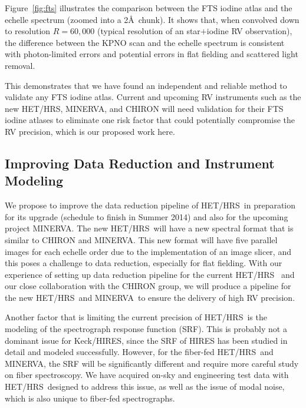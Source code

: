 \documentclass[12pt]{article}
\def\minerva{MINERVA}
\def\hrs{HET/HRS}
\def\keck{Keck/HIRES}
\begin{document}
Figure~\ref{fig:fts} illustrates the comparison between the FTS iodine
atlas and the echelle spectrum (zoomed into a 2\AA\ chunk). It shows
that, when convolved down to resolution $R=60,000$ (typical resolution
of an star$+$iodine RV observation), the difference between the KPNO
scan and the echelle spectrum is consistent with photon-limited
errors and potential errors in flat fielding and scattered light
removal.

This demonstrates that we have found an independent and reliable
method to validate any FTS iodine atlas. Current and upcoming RV
instruments such as the new \hrs, \minerva, and CHIRON will need
validation for their FTS iodine atlases to eliminate one risk factor
that could potentially compromise the RV precision, which is our
proposed work here.

\vspace{-10pt}
\subsection{Improving Data Reduction and Instrument Modeling}\label{sec:ip}
\vspace{-5pt}

We propose to improve the data reduction pipeline of \hrs\ in
preparation for its upgrade (schedule to finish in Summer 2014) and
also for the upcoming project \minerva. The new \hrs\ will have a new spectral
format that is similar to CHIRON and \minerva. This new format will
have five parallel images for each echelle order due to the
implementation of an image slicer, and this poses a challenge to data
reduction, especially for flat fielding. With our experience of
setting up data reduction pipeline for the current
\hrs\ \citep{wang2012} and our close collaboration with the CHIRON
group, we will produce a pipeline for the new \hrs\ and
\minerva\ to ensure the delivery of high RV precision.

Another factor that is limiting the current precision of \hrs\ is the
modeling of the spectrograph response function (SRF). This is probably
not a dominant issue for \keck, since the SRF of HIRES has been
studied in detail and modeled successfully. However, for the fiber-fed
\hrs\ and \minerva, the SRF will be significantly different and
require more careful study on fiber spectroscopy. We have acquired
on-sky and engineering test data with \hrs\ designed to address this
issue, as well as the issue of modal noise, which is also unique to
fiber-fed spectrographs.
\end{document}
